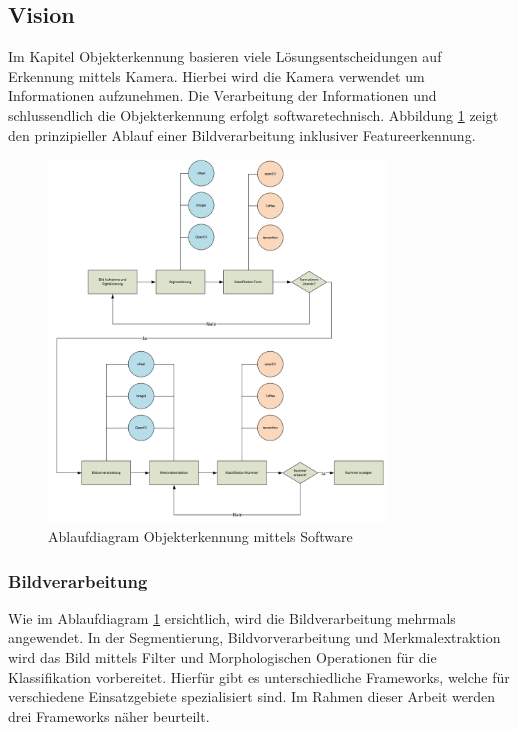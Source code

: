 \documentclass[../../main.tex]{subfiles}
\begin{document}
    \subsection{Vision}
    Im Kapitel Objekterkennung basieren viele Lösungsentscheidungen auf Erkennung mittels Kamera. Hierbei wird die Kamera verwendet um Informationen aufzunehmen. Die Verarbeitung der Informationen und schlussendlich die Objekterkennung erfolgt softwaretechnisch. Abbildung \ref{fig:vision_ablauf} zeigt den prinzipieller Ablauf einer Bildverarbeitung inklusiver Featureerkennung.\\
    \begin{figure}[H] %
        \centering
        \includegraphics[width=0.8\textwidth]{Ablauf_vision.png}
        \caption{Ablaufdiagram Objekterkennung mittels Software}
        \label{fig:vision_ablauf}
    \end{figure}

    \subsubsection{Bildverarbeitung}
        Wie im Ablaufdiagram \ref{fig:vision_ablauf} ersichtlich, wird die Bildverarbeitung mehrmals angewendet. In der Segmentierung, Bildvorverarbeitung und Merkmalextraktion wird das Bild mittels Filter und Morphologischen Operationen für die Klassifikation vorbereitet. Hierfür gibt es unterschiedliche Frameworks, welche für verschiedene Einsatzgebiete spezialisiert sind. Im Rahmen dieser Arbeit werden drei Frameworks näher beurteilt.\\
        \pagebreak
\end{document}
